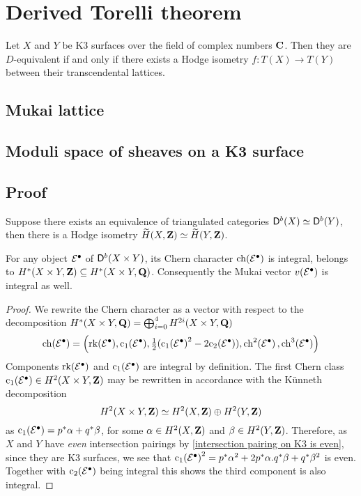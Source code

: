 \section{Derived Torelli theorem}
\label{Chapter: Derived Torelli theorem}

\begin{theorem}
    Let $X$ and $Y$ be K3 surfaces over the field of complex numbers $\mathbf C$. Then they are $D$-equivalent if and only if there exists a Hodge isometry $f\colon T(X) \to T(Y)$ between their transcendental lattices.
\end{theorem}

\subsection{Mukai lattice}
\subsection{Moduli space of sheaves on a K3 surface}
\subsection{Proof}


\begin{proposition}
    Suppose there exists an equivalence of triangulated categories $\mathsf{D}^b(X) \simeq \mathsf{D}^b(Y)$, then there is a Hodge isometry $\widetilde{H}(X, \mathbf Z) \simeq \widetilde{H}(Y, \mathbf Z)$.
\end{proposition}

\begin{lemma}
    For any object $\mathcal E^\bullet$ of $\mathsf{D}^b(X \times Y)$, its Chern character $\ch{\E^\bullet}$ is integral, \ie belongs to $H^*(X \times Y, \mathbf Z) \subseteq H^*(X \times Y, \mathbf Q)$. Consequently the Mukai vector $v(\mathcal E^\bullet)$ is integral as well.
\end{lemma}

\begin{proof}
    We rewrite the Chern character as a vector with respect to the decomposition $H^*(X \times Y, \mathbf Q) = \bigoplus_{i=0}^4 H^{2i}(X \times Y, \mathbf Q)$
    \[
        \ch{\E^\bullet} = \left(\rk{\E^\bullet}, \firstchern(\E^\bullet), \tfrac{1}{2}(\cclass[1]{\E^\bullet}^2 - 2\cclass[2]{\E^\bullet}), \ch[2]{\E^\bullet}, \ch[3]{\E^\bullet} \right)
    \]
    Components $\operatorname{rk}(\mathcal E^\bullet)$ and $\cclass[1]{\E^\bullet}$ are integral by definition. The first Chern class $\cclass[1]{\E^\bullet} \in H^2(X\times Y, \Z)$ may be rewritten in accordance with the Künneth decomposition
    \[
        H^2(X\times Y, \mathbf Z) \simeq H^2(X, \mathbf Z) \oplus H^2(Y, \mathbf Z)
    \]
    as $\cclass[1]{\E^\bullet} = p^*\alpha + q^*\beta$, for some $\alpha \in H^2(X, \mathbf Z)$ and $\beta \in H^2(Y, \mathbf Z)$. Therefore, as $X$ and $Y$ have \emph{even} intersection pairings by \ref{intersection pairing on K3 is even}, since they are K3 surfaces, we see that $\cclass[1]{\E^\bullet}^2 = p^*\alpha^2 + 2 p^*\alpha.q^*\beta + q^*\beta^2$ is even. Together with $\cclass[2]{\E^\bullet}$ being integral this shows the third component is also integral.

\end{proof}

